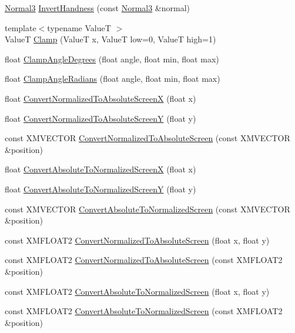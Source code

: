 \begin{DoxyCompactItemize}
\item 
\hyperlink{structmage_1_1_normal3}{Normal3} \hyperlink{namespacemage_a437458a2e3278f106da66534c5218e4e}{Invert\+Handness} (const \hyperlink{structmage_1_1_normal3}{Normal3} \&normal)
\item 
{\footnotesize template$<$typename ValueT $>$ }\\ValueT \hyperlink{namespacemage_aa6dc8bc35accb3ccaac7ee60a5361754}{Clamp} (ValueT x, ValueT low=0, ValueT high=1)
\item 
float \hyperlink{namespacemage_a25d1197c5d3c86cc5d15e8225f796ac3}{Clamp\+Angle\+Degrees} (float angle, float min, float max)
\item 
float \hyperlink{namespacemage_ad538eb214c63b04ec6045e60791b814b}{Clamp\+Angle\+Radians} (float angle, float min, float max)
\item 
float \hyperlink{namespacemage_a2dbd3992e0bcb94b465ab4ab6b7d7f83}{Convert\+Normalized\+To\+Absolute\+ScreenX} (float x)
\item 
float \hyperlink{namespacemage_abc0e5fd9efdcd160a7c4e9b14c8ec7b6}{Convert\+Normalized\+To\+Absolute\+ScreenY} (float y)
\item 
const X\+M\+V\+E\+C\+T\+OR \hyperlink{namespacemage_a37cd57f31a66aac5355061bc3ad4e5ec}{Convert\+Normalized\+To\+Absolute\+Screen} (const X\+M\+V\+E\+C\+T\+OR \&position)
\item 
float \hyperlink{namespacemage_a7ad05dbf5e2b5d625daf57f43b26217f}{Convert\+Absolute\+To\+Normalized\+ScreenX} (float x)
\item 
float \hyperlink{namespacemage_a4300e91e448d76e1015cbc806c1d4467}{Convert\+Absolute\+To\+Normalized\+ScreenY} (float y)
\item 
const X\+M\+V\+E\+C\+T\+OR \hyperlink{namespacemage_add9fc09b8a7166c5e0d0bde63d8f2747}{Convert\+Absolute\+To\+Normalized\+Screen} (const X\+M\+V\+E\+C\+T\+OR \&position)
\item 
const X\+M\+F\+L\+O\+A\+T2 \hyperlink{namespacemage_a34b18c1eb8d1e94675b10c86845e2564}{Convert\+Normalized\+To\+Absolute\+Screen} (float x, float y)
\item 
const X\+M\+F\+L\+O\+A\+T2 \hyperlink{namespacemage_aec1ce8ea913d981f727765f39f79d5e3}{Convert\+Normalized\+To\+Absolute\+Screen} (const X\+M\+F\+L\+O\+A\+T2 \&position)
\item 
const X\+M\+F\+L\+O\+A\+T2 \hyperlink{namespacemage_a98a82c6ca513d50f16d4ee6256fdac29}{Convert\+Absolute\+To\+Normalized\+Screen} (float x, float y)
\item 
const X\+M\+F\+L\+O\+A\+T2 \hyperlink{namespacemage_a9ef1aad29d7631ee2d88467faca6cc56}{Convert\+Absolute\+To\+Normalized\+Screen} (const X\+M\+F\+L\+O\+A\+T2 \&position)

\end{DoxyCompactItemize}
